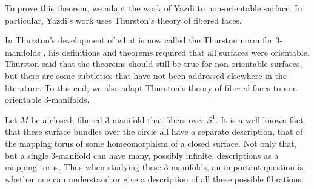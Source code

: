 To prove this theorem, we adapt the work of Yazdi \cite{yazdi2018pseudo} to non-orientable surface.  In particular, Yazdi's work uses Thurston's theory of fibered faces.  

 In Thurston's development of what is now called the Thurston norm for 3-manifolds \cite{thurston1986norm}, his definitions and theorems required that all surfaces were orientable.  Thurston said that the theorems should still be true for non-orientable surfaces, but there are some subtleties that have not been addressed elsewhere in the literature.  To this end, we also adapt Thurston's theory of fibered faces to non-orientable 3-manifolds.



Let $M$ be a closed, fibered 3-manifold that fibers over $S^1$. It is a well known fact that these surface
bundles over the circle all have a separate description, that of the mapping torus of some homeomorphism of a
closed surface. Not only that, but a single 3-manifold can have many, possibly infinite, descriptions as a
mapping torus. Thus when studying these 3-manifolds, an important question is whether one can understand or
give a description of all these possible fibrations.


